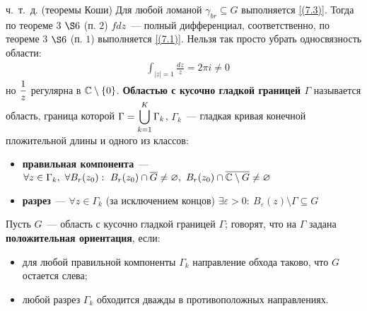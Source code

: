 ч.~т.~д.
\pr (теоремы Коши)
Для любой ломаной $\gamma_{br}\subseteq G$ выполняется \eqref{(7.3)}.
Тогда по теореме $3$ $\S 6$ (п. $2$) $f dz$~--- полный дифференциал,
соответственно, по теореме $3$ $\S 6$ (п. $1$) выполняется \eqref{(7.1)}.
\note
Нельзя так просто убрать односвязность области:
\begin{align*}
  & \int_{\left| z \right| = 1} \frac{dz}{z} = 2 \pi i \neq 0
\end{align*}
но $\displaystyle \frac{1}{z}$ регулярна в $\mathbb{C} \setminus \{0\}$.
\Def
\textbf{Областью с кусочно гладкой границей $\Gamma$} называется область,
граница которой $\Gamma = \displaystyle \bigcup_{k=1}^K\Gamma_k$, $\Gamma_k$~--- гладкая
кривая конечной пложительной длины и одного из классов:
\begin{itemize}
    \item \textbf{правильная компонента}~--- $\forall z \in \Gamma_k, \ \forall
    B_r(z_0): \ B_r(z_0)\cap \overline{G} \neq \varnothing, \ B_r(z_0) \cap
    \overline{\mathbb{C}\setminus G} \neq \varnothing$
    \item \textbf{разрез}~--- $\forall z \in \Gamma_k$ (за исключением концов)
    $\exists \varepsilon > 0: \ B_{\varepsilon}(z) \setminus \Gamma \subseteq G$
\end{itemize}
\Def
Пусть $G$~--- область с кусочно гладкой границей $\Gamma$; говорят, что на
$\Gamma$ задана \textbf{положительная ориентация}, если:
\begin{itemize}
    \item для любой правильной компоненты $\Gamma_k$ направление обхода таково,
    что $G$ остается слева;
    \item любой разрез $\Gamma_k$ обходится дважды в противоположных
    направлениях.
\end{itemize}

